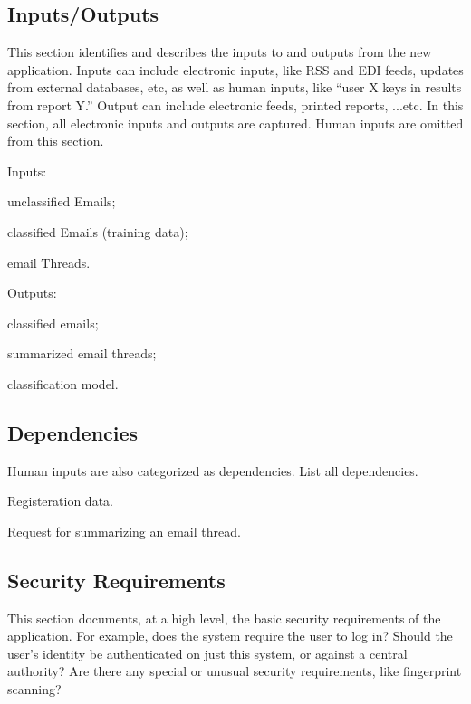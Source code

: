 \subsection{Inputs/Outputs}
This section identifies and describes the inputs to and outputs from the new 
application. Inputs can include electronic inputs, like RSS and EDI feeds, 
updates from external databases, etc, as well as human inputs, like 
``user X keys in results from report Y.'' Output can include electronic feeds, 
printed reports, ...etc. In this section, all electronic inputs and outputs 
are captured. Human inputs are omitted from this section.

\begin{my_enumerate}
  \item Inputs:
  \begin{my_itemize}
    \item unclassified Emails;
    \item classified Emails (training data);
    \item email Threads.
  \end{my_itemize}
  \item Outputs:
  \begin{my_itemize}
    \item classified emails;
    \item summarized email threads;
    \item classification model.
  \end{my_itemize}
\end{my_enumerate}


\subsection{Dependencies}
Human inputs are also categorized as dependencies. List all dependencies.

\begin{my_enumerate}
  \item Registeration data.
  \item Request for summarizing an email thread.
\end{my_enumerate}


\subsection{Security Requirements}
This section documents, at a high level, the basic security requirements of the 
application. For example, does the system require the user to log in?  Should the 
user’s identity be authenticated on just this system, or against a central authority?  
Are there any special or unusual security requirements, like fingerprint scanning?


